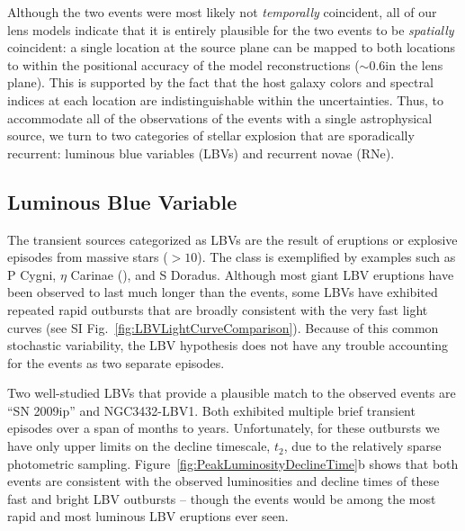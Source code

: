 Although the two events were most likely not {\it temporally}
coincident, all of our lens models indicate that it is entirely
plausible for the two \spock events to be {\it spatially}
coincident: a single location at the source plane can be
mapped to both \spock locations to within the positional accuracy of
the model reconstructions ($\sim$0.6\arcsec in the lens plane). This is
supported by the fact that the host galaxy colors and spectral indices
at each \spock location are indistinguishable within the
uncertainties.  Thus, to accommodate all of the observations of the
\spock events with a single astrophysical source, we turn to two
categories of stellar explosion that are sporadically recurrent:
luminous blue variables (LBVs) and recurrent novae (RNe).

\subsection{Luminous Blue Variable}

The transient sources categorized as LBVs are the result of eruptions
or explosive episodes from massive stars ($>10$\Msun).
The class is exemplified by examples such as P Cygni, $\eta$ Carinae (\etaCar),
and S Doradus\cite{Smith:2011b, Kochanek:2012}.  Although most giant
LBV eruptions have been observed to last much longer than the \spock
events\cite{Smith:2011b}, some LBVs have exhibited repeated rapid
outbursts that are broadly consistent with the very fast \spock light
curves (see SI Fig.~\ref{fig:LBVLightCurveComparison}). Because of
this common stochastic variability, the LBV hypothesis does not
have any trouble accounting for the \spock events as two separate
episodes.

Two well-studied LBVs that provide a plausible match to the observed
\spock events are ``SN 2009ip''\cite{Maza:2009} and
NGC3432-LBV1\cite{Pastorello:2010}.  Both exhibited multiple brief
transient episodes over a span of months to years\cite{Miller:2009,
  Li:2009, Berger:2009, Drake:2010, Pastorello:2010}.  Unfortunately,
for these outbursts we have only upper limits on the decline
timescale, $t_2$, due to the relatively sparse photometric sampling.
Figure~\ref{fig:PeakLuminosityDeclineTime}b shows that both \spock
events are consistent with the observed luminosities and decline times
of these fast and bright LBV outbursts -- though the \spock events
would be among the most rapid and most luminous LBV eruptions ever
seen.

